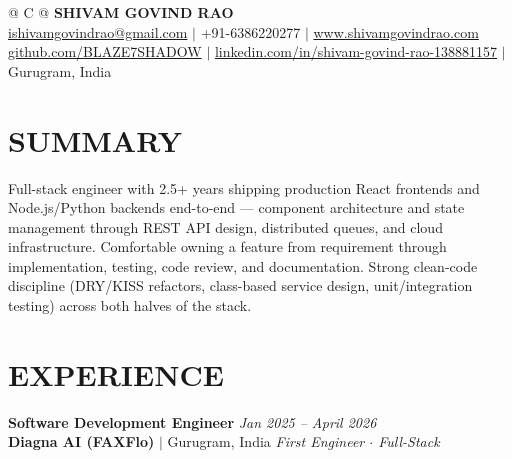 \documentclass[a4paper,10pt]{article}
\begin{document}
\pagestyle{empty}

\begin{tabularx}{\linewidth}{@{} C @{}}
\Huge{\textbf{SHIVAM GOVIND RAO}} \\[6pt]
\normalsize{\href{mailto:ishivamgovindrao@gmail.com}{ishivamgovindrao@gmail.com} $|$ +91-6386220277 $|$ \href{https://www.shivamgovindrao.com}{www.shivamgovindrao.com}} \\
\normalsize{\href{https://github.com/BLAZE7SHADOW}{github.com/BLAZE7SHADOW} $|$ \href{https://www.linkedin.com/in/shivam-govind-rao-138881157/}{linkedin.com/in/shivam-govind-rao-138881157} $|$ Gurugram, India}
\end{tabularx}

\vspace{3pt}

\section{SUMMARY}

Full-stack engineer with 2.5+ years shipping production React frontends and Node.js/Python backends end-to-end --- component architecture and state management through REST API design, distributed queues, and cloud infrastructure. Comfortable owning a feature from requirement through implementation, testing, code review, and documentation. Strong clean-code discipline (DRY/KISS refactors, class-based service design, unit/integration testing) across both halves of the stack.

\section{EXPERIENCE}

\textbf{Software Development Engineer} \hfill \textit{Jan 2025 -- April 2026}\\
\textbf{Diagna AI (FAXFlo)} $|$ Gurugram, India \hfill \textit{First Engineer $\cdot$ Full-Stack}
\end{document}
